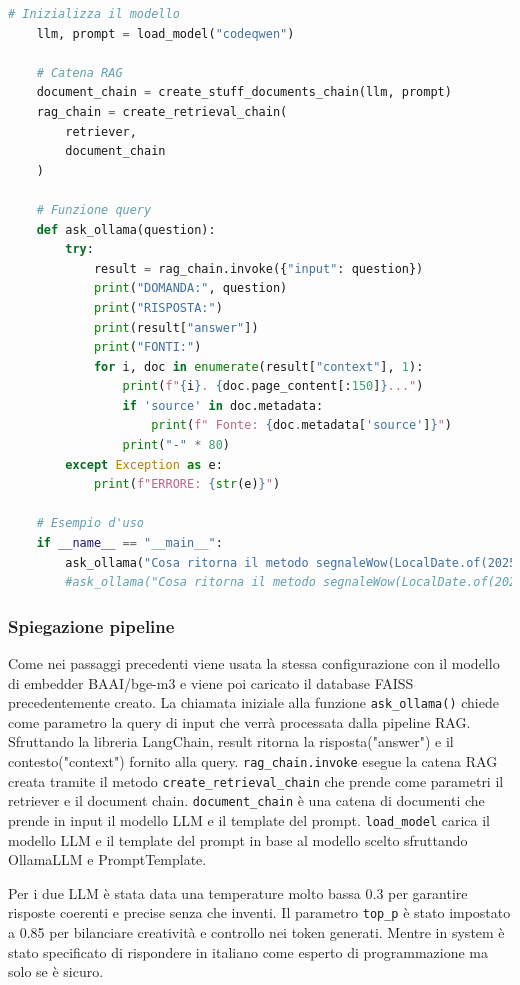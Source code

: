 \documentclass[12pt,a4paper,openright,twoside]{book}
\begin{document}
\begin{lstlisting}[language=Python, caption={Pipeline RAG}, label={lst:rag}]
    # Inizializza il modello
    llm, prompt = load_model("codeqwen")
    
    # Catena RAG
    document_chain = create_stuff_documents_chain(llm, prompt)
    rag_chain = create_retrieval_chain(
        retriever,
        document_chain
    )
    
    # Funzione query
    def ask_ollama(question):
        try:
            result = rag_chain.invoke({"input": question})
            print("DOMANDA:", question)
            print("RISPOSTA:")
            print(result["answer"])
            print("FONTI:")
            for i, doc in enumerate(result["context"], 1):
                print(f"{i}. {doc.page_content[:150]}...")
                if 'source' in doc.metadata:
                    print(f" Fonte: {doc.metadata['source']}")
                print("-" * 80)
        except Exception as e:
            print(f"ERRORE: {str(e)}")
    
    # Esempio d'uso
    if __name__ == "__main__":
        ask_ollama("Cosa ritorna il metodo segnaleWow(LocalDate.of(2025, 1, 10)) che utilizza la funzione getMessaggioMagico() della libreria DateUtilCustom?")
        #ask_ollama("Cosa ritorna il metodo segnaleWow(LocalDate.of(2025, 1, 10))?")
\end{lstlisting}
\subsubsection{Spiegazione pipeline}
Come nei passaggi precedenti viene usata la stessa configurazione con il modello di embedder BAAI/bge-m3 e
viene poi caricato il database FAISS precedentemente creato.
La chiamata iniziale alla funzione \texttt{ask\_ollama()} chiede come parametro la query di input che verr\`a processata dalla pipeline RAG\@.
Sfruttando la libreria LangChain, result ritorna la risposta("answer") e il contesto("context") fornito alla query.
\newline\texttt{rag\_chain.invoke} esegue la catena RAG creata tramite il metodo \texttt{create\_retrieval\_chain} che prende come parametri il retriever e il document chain.
\newline\texttt{document\_chain} è una catena di documenti che prende in input il modello LLM e il template del prompt.
\newline\texttt{load\_model} carica il modello LLM e il template del prompt in base al modello scelto sfruttando OllamaLLM e PromptTemplate.

Per i due LLM è stata data una temperature molto bassa 0.3 per garantire risposte coerenti e precise senza che inventi.
Il parametro \texttt{top\_p} è stato impostato a 0.85 per bilanciare creatività e controllo nei token generati.
Mentre in system è stato specificato di rispondere in italiano come esperto di programmazione ma solo se è sicuro.
\end{document}
